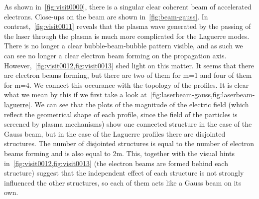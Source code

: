 \documentclass[12pt, class=report, crop=false]{standalone}
\begin{document}
As shown in~\cref{fig:visit0000}, there is a singular clear coherent beam of accelerated electrons. Close-ups on the beam are shown in~\cref{fig:beam-gauss}. In contrast,~\cref{fig:visit0011} reveals that the plasma wave generated by the passing of the laser through the plasma is much more complicated for the Laguerre modes. There is no longer a clear bubble-beam-bubble pattern visible, and as such we can see no longer a clear electron beam forming on the propagation axis. However,~\cref{fig:visit0012,fig:visit0013} shed light on this matter. It seems that there are electron beams forming, but there are two of them for m=1 and four of them for m=4. We connect this occurance with the topology of the profiles. It is clear what we mean by this if we first take a look at~\cref{fig:laserbeam-gauss,fig:laserbeam-laguerre}. We can see that the plots of the magnitude of the electric field (which reflect the geometrical shape of each profile, since the field of the particles is screened by plasma mechanisms) show one connected structure in the case of the Gauss beam, but in the case of the Laguerre profiles there are disjointed structures. The number of disjointed structures is equal to the number of electron beams forming and is also equal to 2m. This, together with the visual hints in~\cref{fig:visit0012,fig:visit0013} (the electron beams are formed behind each structure) suggest that the independent effect of each structure is not strongly influenced the other structures, so each of them acts like a Gauss beam on its own.
\end{document}
